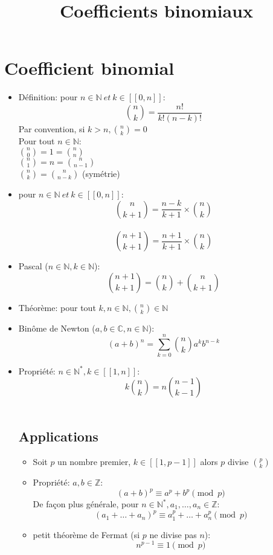 \documentclass[fleqn]{article}
\title{Coefficients binomiaux}
\date{}
\begin{document}
\maketitle

\section{Coefficient binomial}
\begin{itemize}
	\item D\'{e}finition: pour \(n \in \mathbb{N}\ et\ k \in [\![0,n]\!]\): \\
		\[ \binom{n}{k} = \frac{n!}{k!(n-k)!} \]
		Par convention, si \(k>n, \binom{n}{k} = 0\) \\
		Pour tout \(n \in \mathbb{N}:\) \\
		\(\binom{n}{0} = 1 = \binom{n}{n}\) \\
		\(\binom{n}{1} = n = \binom{n}{n-1}\) \\
		\(\binom{n}{k} = \binom{n}{n-k}\) (sym\'etrie)
	\item pour \(n \in \mathbb{N}\ et\ k \in [\![0,n]\!]\): \\
		\[\binom{n}{k+1} = \frac{n-k}{k+1} \times \binom{n}{k} \] \\
		\[\binom{n+1}{k+1} = \frac{n+1}{k+1} \times \binom{n}{k} \]
	\item Pascal (\(n \in \mathbb{N}, k \in \mathbb{N}\)): \\
		\[\binom{n+1}{k+1} = \binom{n}{k} + \binom{n}{k+1}\]
	\item Th\'{e}or\`{e}me: pour tout \(k,n \in \mathbb{N}, \binom{n}{k} \in \mathbb{N}\) \\
	\item Bin\^{o}me de Newton (\(a,b \in \mathbb{C}, n \in \mathbb{N}\)): \\
		\[(a+b)^n = \sum_{k=0}^{n} \binom{n}{k}a^kb^{n-k}\]
	\item Propri\'{e}t\'{e}: \(n \in \mathbb{N}^*, k \in [\![1,n]\!]\): \\
		\[k\binom{n}{k} = n\binom{n-1}{k-1}\] \\
	\subsection{Applications}
	\begin{itemize}
		\item Soit \(p\) un nombre premier, \(k \in [\![1,p-1]\!]\) alors \(p\) divise \(\binom{p}{k}\) \\
		\item Propri\'{e}t\'{e}: \(a,b \in \mathbb{Z}\): \\
			\[(a+b)^p \equiv a^p + b^p \pmod{p}\]
			De fa\c{c}on plus g\'en\'erale, pour \(n \in \mathbb{N}^*, a_1, \hdots, a_n \in \mathbb{Z}\): \\
			\[(a_1+\hdots+a_n)^p \equiv a_1^p+\hdots+a_n^p \pmod{p}\]
		\item petit th\'eor\`eme de Fermat (si \(p\) ne divise pas \(n\)): \\
			\[n^{p-1} \equiv 1\pmod{p} \]
	\end{itemize}
\end{itemize}
\end{document}
